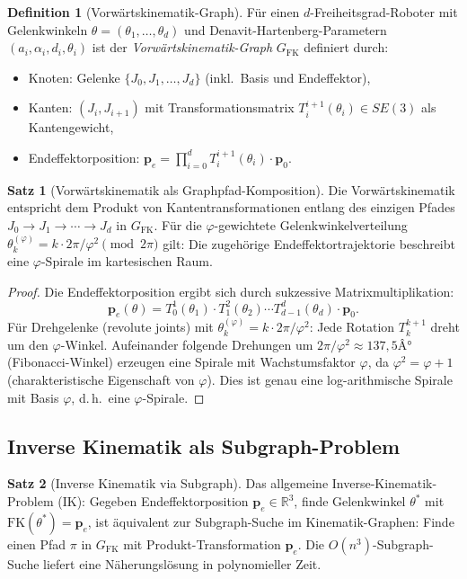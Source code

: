 ﻿\documentclass[a4paper,12pt]{article}
\theoremstyle{definition}
\newtheorem{definition}{Definition}
\newtheorem{satz}{Satz}
\begin{document}
\begin{definition}[Vorw\"artskinematik-Graph]
F\"ur einen $d$-Freiheitsgrad-Roboter mit Gelenkwinkeln
$\theta = (\theta_1, \ldots, \theta_d)$ und
Denavit-Hartenberg-Parametern $(a_i, \alpha_i, d_i, \theta_i)$
ist der \emph{Vorw\"artskinematik-Graph} $G_{\mathrm{FK}}$
definiert durch:
\begin{itemize}
    \item Knoten: Gelenke $\{J_0, J_1, \ldots, J_d\}$ (inkl.\ Basis und Endeffektor),
    \item Kanten: $(J_i, J_{i+1})$ mit Transformationsmatrix
          $T_i^{i+1}(\theta_i) \in SE(3)$ als Kantengewicht,
    \item Endeffektorposition: $\mathbf{p}_e = \prod_{i=0}^d T_i^{i+1}(\theta_i) \cdot \mathbf{p}_0$.
\end{itemize}
\end{definition}

\begin{satz}[Vorw\"artskinematik als Graphpfad-Komposition]
\label{satz:fk_graph}
Die Vorw\"artskinematik entspricht dem Produkt von Kantentransformationen
entlang des einzigen Pfades $J_0 \to J_1 \to \cdots \to J_d$ in $G_{\mathrm{FK}}$.
F\"ur die $\varphi$-gewichtete Gelenkwinkelverteilung
$\theta_k^{(\varphi)} = k \cdot 2\pi/\varphi^2 \pmod{2\pi}$ gilt:
Die zugeh\"orige Endeffektortrajektorie beschreibt eine $\varphi$-Spirale
im kartesischen Raum.
\end{satz}

\begin{proof}
Die Endeffektorposition ergibt sich durch sukzessive Matrixmultiplikation:
\[
\mathbf{p}_e(\theta) = T_0^1(\theta_1) \cdot T_1^2(\theta_2) \cdots T_{d-1}^d(\theta_d) \cdot \mathbf{p}_0.
\]
F\"ur Drehgelenke (revolute joints) mit $\theta_k^{(\varphi)} = k \cdot 2\pi/\varphi^2$:
Jede Rotation $T_k^{k+1}$ dreht um den $\varphi$-Winkel.
Aufeinander folgende Drehungen um $2\pi/\varphi^2 \approx 137{,}5Â°$
(Fibonacci-Winkel) erzeugen eine Spirale mit Wachstumsfaktor $\varphi$,
da $\varphi^2 = \varphi + 1$ (charakteristische Eigenschaft von $\varphi$).
Dies ist genau eine log-arithmische Spirale mit Basis $\varphi$,
d.\,h.\ eine $\varphi$-Spirale.
\end{proof}

\subsection{Inverse Kinematik als Subgraph-Problem}

\begin{satz}[Inverse Kinematik via Subgraph]
\label{satz:ik_subgraph}
Das allgemeine Inverse-Kinematik-Problem (IK): Gegeben Endeffektorposition
$\mathbf{p}_e \in \mathbb{R}^3$, finde Gelenkwinkel $\theta^*$ mit
$\mathrm{FK}(\theta^*) = \mathbf{p}_e$, ist \"aquivalent zur
Subgraph-Suche im Kinematik-Graphen: Finde einen Pfad $\pi$ in $G_{\mathrm{FK}}$
mit Produkt-Transformation $\mathbf{p}_e$.
Die $O(n^3)$-Subgraph-Suche liefert eine N\"aherungsl\"osung in polynomieller Zeit.
\end{satz}
\end{document}

